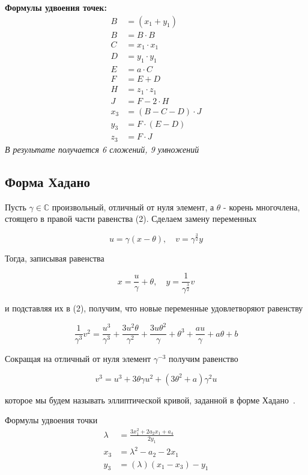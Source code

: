 \textbf{Формулы удвоения точек:~\cite{edwards-formulas}}
\begin{align*}
B &= (x_1 + y_1) \\
B &= B \cdot B \\
C &= x_1 \cdot x_1 \\
D &= y_1 \cdot y_1 \\
E &= a \cdot C \\
F &= E + D \\
H &= z_1 \cdot z_1 \\
J &= F - 2 \cdot H \\
x_3 &= (B - C - D) \cdot J \\
y_3 &= F \cdot (E - D) \\
z_3 &= F \cdot J
\end{align*}
\textit{В результате получается 6 сложений, 9 умножений}


\subsection{Форма Хадано}
Пусть $\gamma \in \mathbb{C}$ произвольный, отличный от нуля элемент, а $\theta$ - корень многочлена, стоящего в правой части равенства (2). Сделаем замену переменных

$$
u=\gamma(x-\theta), \quad v=\gamma^{\frac{3}{2}} y
$$

Тогда, записывая равенства

$$
x=\frac{u}{\gamma}+\theta, \quad y=\frac{1}{\gamma^{\frac{3}{2}}} v
$$

и подставляя их в (2), получим, что новые переменные удовлетворяют равенству

$$
\frac{1}{\gamma^{3}} v^{2}=\frac{u^{3}}{\gamma^{3}}+\frac{3 u^{2} \theta}{\gamma^{2}}+\frac{3 u \theta^{2}}{\gamma}+\theta^{3}+\frac{a u}{\gamma}+a \theta+b
$$

Сокращая на отличный от нуля элемент $\gamma^{-3}$ получим равенство

$$
v^{3}=u^{3}+3 \theta \gamma u^{2}+\left(3 \theta^{2}+a\right) \gamma^{2} u
$$

которое мы будем называть эллиптической кривой, заданной в форме Хадано~\cite{hadano-curve}.

Формулы удвоения точки
\begin{align*}
\lambda &= \frac{3x_1^2 + 2a_2x_1 + a_4}{2y_1} \\
x_3 &= \lambda^2 - a_2 - 2x_1 \\
y_3 &= (\lambda)(x_1 - x_3) - y_1
\end{align*}

